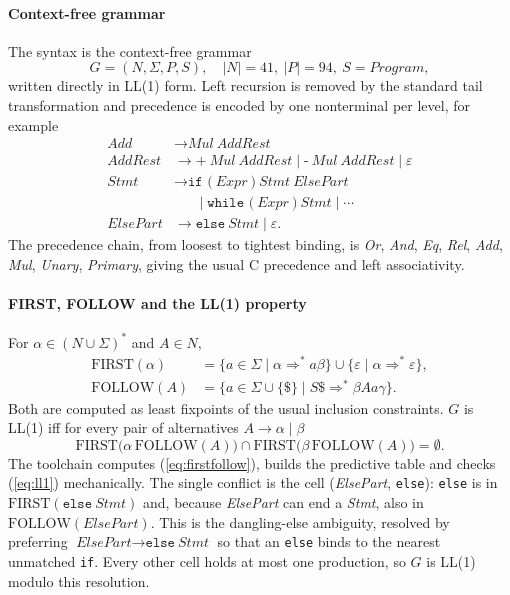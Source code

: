 \documentclass[conference]{IEEEtran}
\newcommand{\First}{\mathrm{FIRST}}
\newcommand{\Follow}{\mathrm{FOLLOW}}
\newcommand{\nt}[1]{\textit{#1}}
\newcommand{\tm}[1]{\texttt{#1}}
\begin{document}
\paragraph*{Context-free grammar}
The syntax is the context-free grammar
\begin{equation}
G=(N,\Sigma,P,S),\quad |N|=41,\ |P|=94,\ S=\nt{Program},
\label{eq:grammar}
\end{equation}
written directly in LL(1) form. Left recursion is removed by the
standard tail transformation and precedence is encoded by one
nonterminal per level, for example
\begin{align*}
\nt{Add} &\to \nt{Mul}\ \nt{AddRest}\\
\nt{AddRest} &\to \tm{+}\ \nt{Mul}\ \nt{AddRest} \mid
                \tm{-}\ \nt{Mul}\ \nt{AddRest} \mid \varepsilon\\
\nt{Stmt} &\to \tm{if (}\ \nt{Expr}\ \tm{)}\ \nt{Stmt}\ \nt{ElsePart}\\
          &\phantom{{}\to{}} \mid \tm{while (}\ \nt{Expr}\ \tm{)}\ \nt{Stmt} \mid \cdots\\
\nt{ElsePart} &\to \tm{else}\ \nt{Stmt} \mid \varepsilon .
\end{align*}
The precedence chain, from loosest to tightest binding, is
\nt{Or}, \nt{And}, \nt{Eq}, \nt{Rel}, \nt{Add}, \nt{Mul}, \nt{Unary},
\nt{Primary}, giving the usual C precedence and left associativity.

\paragraph*{FIRST, FOLLOW and the LL(1) property}
For $\alpha\in(N\cup\Sigma)^\ast$ and $A\in N$,
\begin{equation}
\begin{aligned}
\First(\alpha) &= \{a\in\Sigma \mid \alpha \Rightarrow^\ast a\beta\}
                  \cup \{\varepsilon \mid \alpha\Rightarrow^\ast\varepsilon\},\\
\Follow(A) &= \{a\in\Sigma\cup\{\$\} \mid S\$ \Rightarrow^\ast \beta A a \gamma\}.
\end{aligned}
\label{eq:firstfollow}
\end{equation}
Both are computed as least fixpoints of the usual inclusion constraints.
$G$ is LL(1) iff for every pair of alternatives $A\to\alpha\mid\beta$
\begin{equation}
\First\big(\alpha\,\Follow(A)\big)\cap\First\big(\beta\,\Follow(A)\big)=\emptyset .
\label{eq:ll1}
\end{equation}
The toolchain computes (\ref{eq:firstfollow}), builds the predictive
table and checks (\ref{eq:ll1}) mechanically. The single conflict is
the cell (\nt{ElsePart}, \tm{else}): \tm{else} is in $\First(\tm{else}\
\nt{Stmt})$ and, because \nt{ElsePart} can end a \nt{Stmt}, also in
$\Follow(\nt{ElsePart})$. This is the dangling-else ambiguity, resolved
by preferring $\nt{ElsePart}\to\tm{else}\ \nt{Stmt}$ so that an
\tm{else} binds to the nearest unmatched \tm{if}. Every other cell holds
at most one production, so $G$ is LL(1) modulo this resolution.
\end{document}
